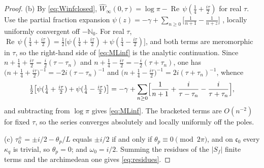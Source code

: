 \documentclass[11pt]{amsart}
\theoremstyle{definition}
\theoremstyle{remark}
\newcommand{\N}{\mathbb N}
\newcommand{\Rel}{\operatorname{Re}}
\newcommand{\Wh}{\widehat{W}}
\begin{document}
\begin{proof}
(b)  By \eqref{eq:Winfclosed}, $\Wh_{\infty}(0,\tau)=\log\pi-\Rel\,
\psi(\tfrac14+\tfrac{i\tau}2)$ for real $\tau$.  Use the partial fraction
expansion
$\psi(z)=-\gamma+\sum_{n\ge0}\bigl[\tfrac1{n+1}-\tfrac1{n+z}\bigr]$
\cite[(5.7.6)]{DLMF}, locally uniformly convergent off $-\N_0$.  For real $\tau$,
$\Rel\,\psi(\tfrac14+\tfrac{i\tau}2)=\tfrac12\bigl[\psi(\tfrac14+\tfrac{i\tau}2)
+\psi(\tfrac14-\tfrac{i\tau}2)\bigr]$, and both terms are meromorphic in
$\tau$, so the right-hand side of \eqref{eq:MLinf} is the analytic
continuation.  Since $n+\tfrac14+\tfrac{i\tau}2=\tfrac i2(\tau-\tau_n)$ and
$n+\tfrac14-\tfrac{i\tau}2=-\tfrac i2(\tau+\tau_n)$, one has
$\bigl(n+\tfrac14+\tfrac{i\tau}2\bigr)^{-1}=-2i(\tau-\tau_n)^{-1}$ and
$\bigl(n+\tfrac14-\tfrac{i\tau}2\bigr)^{-1}=2i(\tau+\tau_n)^{-1}$, whence
\[
\tfrac12\bigl[\psi(\tfrac14+\tfrac{i\tau}2)+\psi(\tfrac14-\tfrac{i\tau}2)\bigr]
=-\gamma+\sum_{n\ge0}\Bigl[\frac1{n+1}+\frac{i}{\tau-\tau_n}
-\frac{i}{\tau+\tau_n}\Bigr],
\]
and subtracting from $\log\pi$ gives \eqref{eq:MLinf}.  The bracketed terms are
$O(n^{-2})$ for fixed $\tau$, so the series converges absolutely and locally
uniformly off the poles.

(c)  $\tau_0^{\pm}=\pm i/2-\theta_p/L$ equals $\pm i/2$ if and only if
$\theta_p\equiv0\pmod{2\pi}$, and on $\mathfrak c_0$ every $\kappa_q$ is
trivial, so $\theta_p=0$; and $\omega_0=i/2$.  Summing the residues of the
$|S_f|$ finite terms and the archimedean one gives \eqref{eq:residues}.


\end{proof}
\end{document}
